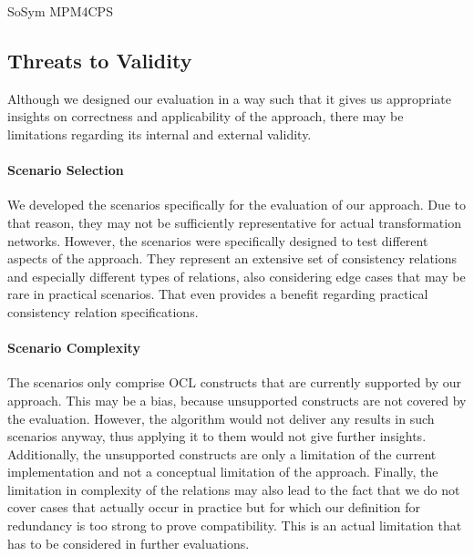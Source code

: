 \begin{copiedFrom}{SoSym MPM4CPS}


\subsection{Threats to Validity}

Although we designed our evaluation in a way such that it gives us appropriate insights on correctness and applicability of the approach, there may be limitations regarding its internal and external validity. %

\paragraph{Scenario Selection}
We developed the scenarios specifically for the evaluation of our approach.
Due to that reason, they may not be sufficiently representative for actual transformation networks. 
However, the scenarios were specifically designed to test different aspects of the approach.
They represent an extensive set of consistency relations and especially different types of relations, also considering edge cases that may be rare in practical scenarios.
That even provides a benefit regarding practical consistency relation specifications.

\paragraph{Scenario Complexity}
The scenarios only comprise OCL constructs that are currently supported by our approach.
This may be a bias, because unsupported constructs are not covered by the evaluation.
However, the algorithm would not deliver any results in such scenarios anyway, thus applying it to them would not give further insights.
Additionally, the unsupported constructs are only a limitation of the current implementation and not a conceptual limitation of the approach.
Finally, the limitation in complexity of the relations may also lead to the fact that we do not cover cases that actually occur in practice but for which our definition for redundancy is too strong to prove compatibility.
This is an actual limitation that has to be considered in further evaluations.


\end{copiedFrom}
